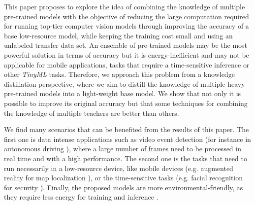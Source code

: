 \documentclass{elsarticle}
\begin{document}
	 This paper proposes to explore the idea of combining the knowledge of multiple pre-trained models with the objective of reducing the large computation required for running top-tier computer vision models through improving the accuracy of a base low-resource model, while keeping the training cost small and using an unlabeled transfer data set. 	An ensemble of pre-trained models may be the most powerful solution in terms of accuracy but it is energy-inefficient and may not be applicable for mobile applications, tasks that require a time-sensitive inference \citep{sanchez2020} or other \textit{TinyML} tasks. Therefore, we approach this problem from a knowledge distillation perspective, where we aim to distill the knowledge of multiple heavy pre-trained models into a light-weight base model. We show that not only it is possible to improve its original accuracy but that some techniques for combining the knowledge of multiple teachers are better than others. 
	 
	 We find many scenarios that can be benefited from the results of this paper. The first one is data intense applications such as video event detection \cite{chakraborty2021} (for instance in autonomous driving \cite{swaminathan2019}), where a large number of frames need to be processed in real time and with a high performance. The second one is the tasks that need to run necessarily in a low-resource device, like mobile devices (e.g. augmented reality for map localization \cite{limmer2017}), or the time-sensitive tasks (e.g. facial recognition for security \cite{aung2021}). Finally, the proposed models are more environmental-friendly, as they require less energy for training and inference \cite{wu2022sustainable}.
\end{document}
